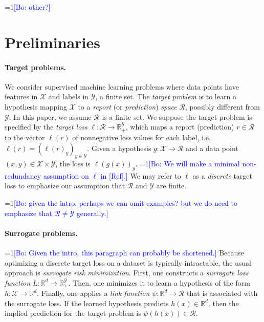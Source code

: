 \documentclass{article}
\newcommand{\Comments}{1}
\newcommand{\mynote}[2]{\ifnum\Comments=1\textcolor{#1}{#2}\fi}
\newcommand{\bo}[1]{\mynote{blue}{[Bo: #1]}}
\newcommand{\reals}{\mathbb{R}}
\newcommand{\R}{\mathcal{R}}
\newcommand{\X}{\mathcal{X}}
\newcommand{\Y}{\mathcal{Y}}
\begin{document}
\bo{other?}


\section{Preliminaries}

\paragraph{Target problems.}
We consider supervised machine learning problems where data points have features in $\X$ and labels in $\Y$, a finite set.
The \emph{target problem} is to learn a hypothesis mapping $\X$ to a \emph{report} (or \emph{prediction}) \emph{space} $\R$, possibly different from $\Y$.
In this paper, we assume $\R$ is a finite set.
We suppose the target problem is specified by the \emph{target loss} $\ell:\R\to\reals^\Y_+$, which maps a report (prediction) $r \in \R$ to the vector $\ell(r)$ of nonnegative loss values for each label, i.e. $\ell(r) = (\ell(r)_y)_{y\in\Y}$.
Given a hypothesis $g: \X \to \R$ and a data point $(x,y) \in \X \times \Y$, the loss is $\ell(g(x))_y$.
\bo{We will make a minimal non-redundancy assumption on $\ell$ in [Ref].}
We may refer to $\ell$ as a \emph{discrete} target loss to emphasize our assumption that $\R$ and $\Y$ are finite.

\bo{given the intro, perhaps we can omit examples? but we do need to emphasize that $\R \neq \Y$ generally.}



\paragraph{Surrogate problems.}
\bo{Given the intro, this paragraph can probably be shortened.}
Because optimizing a discrete target loss on a dataset is typically intractable, the usual approach is \emph{surrogate risk minimization}.
First, one constructs a \emph{surrogate loss function} $L:\reals^d\to\reals^\Y_+$.
Then, one minimizes it to learn a hypothesis of the form $h: \X \to \reals^d$.
Finally, one applies a \emph{link function} $\psi: \reals^d \to \R$ that is associated with the surrogate loss.
If the learned hypothesis predicts $h(x) \in \reals^d$, then the implied prediction for the target problem is $\psi(h(x)) \in \R$.
\end{document}
